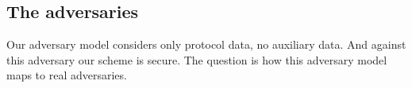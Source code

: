 



%
%
%

\subsection{The adversaries}

Our adversary model considers only protocol data, no auxiliary data.
And against this adversary our scheme is secure.
The question is how this adversary model maps to real adversaries.

